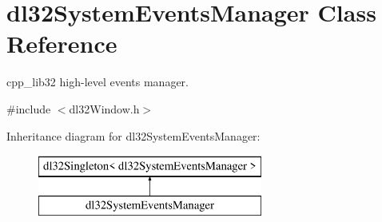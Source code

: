 \hypertarget{classdl32_system_events_manager}{\section{dl32\-System\-Events\-Manager Class Reference}
\label{classdl32_system_events_manager}
}


cpp\-\_\-lib32 high-\/level events manager.  




{\ttfamily \#include $<$dl32\-Window.\-h$>$}

Inheritance diagram for dl32\-System\-Events\-Manager\-:\begin{figure}[H]
\begin{center}
\leavevmode
\includegraphics[height=2.000000cm]{classdl32_system_events_manager}
\end{center}
\end{figure}
